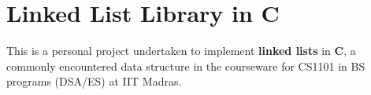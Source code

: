 \chapter{Linked List Library in C}
\hypertarget{index}{}\label{index}
\label{index_md_README}%
%
 This is a personal project undertaken to implement {\bfseries{linked lists}} in {\bfseries{C}}, a commonly encountered data structure in the courseware for CS1101 in BS programs (DSA/\+ES) at IIT Madras. ~\newline
 